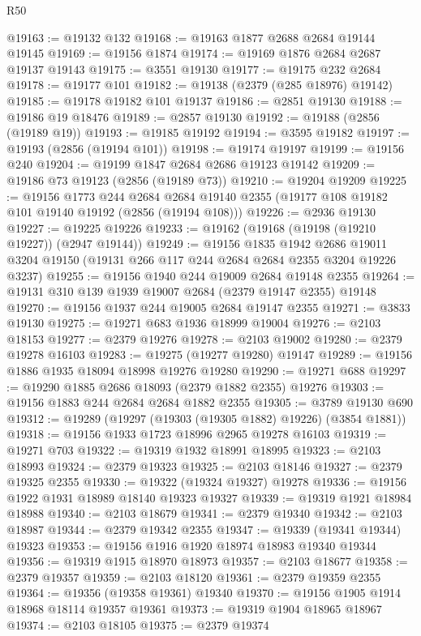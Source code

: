 \begin{lexlean}{R50}
\begin{coremodule}
@19163 := @19132 @132
@19168 := @19163 @1877 @2688 @2684 @19144 @19145
@19169 := @19156 @1874
@19174 := @19169 @1876 @2684 @2687 @19137 @19143
@19175 := @3551 @19130
@19177 := @19175 @232 @2684
@19178 := @19177 @101
@19182 := @19138 (@2379 (@285 @18976) @19142)
@19185 := @19178 @19182 @101 @19137
@19186 := @2851 @19130
@19188 := @19186 @19 @18476
@19189 := @2857 @19130
@19192 := @19188 (@2856 (@19189 @19))
@19193 := @19185 @19192
@19194 := @3595 @19182
@19197 := @19193 (@2856 (@19194 @101))
@19198 := @19174 @19197
@19199 := @19156 @240
@19204 := @19199 @1847 @2684 @2686 @19123 @19142
@19209 := @19186 @73 @19123 (@2856 (@19189 @73))
@19210 := @19204 @19209
@19225 := @19156
    @1773
    @244
    @2684
    @2684
    @19140
    @2355
    (@19177 @108 @19182 @101 @19140 @19192 (@2856 (@19194 @108)))
@19226 := @2936 @19130
@19227 := @19225 @19226
@19233 := @19162 (@19168 (@19198 (@19210 @19227)) (@2947 @19144))
@19249 := @19156
    @1835
    @1942
    @2686
    @19011
    @3204
    @19150
    (@19131 @266 @117 @244 @2684 @2684 @2355 @3204 @19226 @3237)
@19255 := @19156 @1940 @244 @19009 @2684 @19148 @2355
@19264 := @19131 @310 @139 @1939 @19007 @2684 (@2379 @19147 @2355) @19148
@19270 := @19156 @1937 @244 @19005 @2684 @19147 @2355
@19271 := @3833 @19130
@19275 := @19271 @683 @1936 @18999 @19004
@19276 := @2103 @18153
@19277 := @2379 @19276
@19278 := @2103 @19002
@19280 := @2379 @19278 @16103
@19283 := @19275 (@19277 @19280) @19147
@19289 := @19156 @1886 @1935 @18094 @18998 @19276 @19280
@19290 := @19271 @688
@19297 := @19290 @1885 @2686 @18093 (@2379 @1882 @2355) @19276
@19303 := @19156 @1883 @244 @2684 @2684 @1882 @2355
@19305 := @3789 @19130 @690
@19312 := @19289 (@19297 (@19303 (@19305 @1882) @19226) (@3854 @1881))
@19318 := @19156 @1933 @1723 @18996 @2965 @19278 @16103
@19319 := @19271 @703
@19322 := @19319 @1932 @18991 @18995
@19323 := @2103 @18993
@19324 := @2379 @19323
@19325 := @2103 @18146
@19327 := @2379 @19325 @2355
@19330 := @19322 (@19324 @19327) @19278
@19336 := @19156 @1922 @1931 @18989 @18140 @19323 @19327
@19339 := @19319 @1921 @18984 @18988
@19340 := @2103 @18679
@19341 := @2379 @19340
@19342 := @2103 @18987
@19344 := @2379 @19342 @2355
@19347 := @19339 (@19341 @19344) @19323
@19353 := @19156 @1916 @1920 @18974 @18983 @19340 @19344
@19356 := @19319 @1915 @18970 @18973
@19357 := @2103 @18677
@19358 := @2379 @19357
@19359 := @2103 @18120
@19361 := @2379 @19359 @2355
@19364 := @19356 (@19358 @19361) @19340
@19370 := @19156 @1905 @1914 @18968 @18114 @19357 @19361
@19373 := @19319 @1904 @18965 @18967
@19374 := @2103 @18105
@19375 := @2379 @19374

\end{coremodule}
\end{lexlean}
